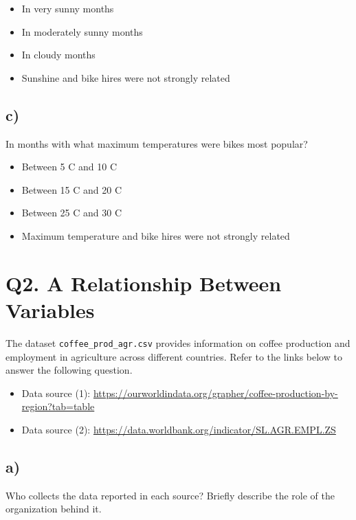 \documentclass[12pt]{article}
\begin{document}
\begin{itemize}[leftmargin=1.5cm]
    \item In very sunny months
    \item In moderately sunny months
    \item In cloudy months
    \item Sunshine and bike hires were not strongly related
\end{itemize}

\subsection*{c)} In months with what maximum temperatures were bikes most popular?

\begin{itemize}[leftmargin=1.5cm]
    \item Between 5 C and 10 C
    \item Between 15 C and 20 C
    \item Between 25 C and 30 C
    \item Maximum temperature and bike hires were not strongly related
\end{itemize}

\section*{Q2. A Relationship Between Variables}

The dataset \texttt{coffee\_prod\_agr.csv} provides information on coffee production and employment in agriculture across different countries. Refer to the links below to answer the following question.

\begin{itemize}
    \item Data source (1): \url{https://ourworldindata.org/grapher/coffee-production-by-region?tab=table}
    \item Data source (2): \url{https://data.worldbank.org/indicator/SL.AGR.EMPL.ZS}
\end{itemize}

\subsection*{a)} Who collects the data reported in each source? Briefly describe the role of the organization behind it.\\
\end{document}
